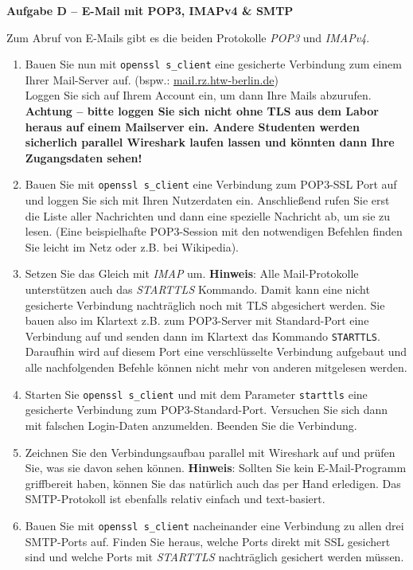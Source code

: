 \documentclass[paper=a4,fontsize=11pt]{scrartcl}%
\numberwithin{equation}{section}
\begin{document}
\begin{center}\Large{\textbf{Aufgabe D -- E-Mail mit POP3, IMAPv4 \& SMTP}}\end{center}\vskip0.25in
Zum Abruf von E-Mails gibt es die beiden Protokolle \emph{POP3} und \emph{IMAPv4}.
\begin{enumerate}
	\item Bauen Sie nun mit \texttt{openssl s\_client} eine gesicherte Verbindung zum einem Ihrer Mail-Server auf. (bspw.: \url{mail.rz.htw-berlin.de})\\
	Loggen Sie sich auf Ihrem Account ein, um dann Ihre Mails abzurufen.\\
	{\color{red}\textbf{Achtung -- bitte loggen Sie sich nicht ohne TLS aus dem Labor heraus auf einem Mailserver ein. Andere Studenten werden sicherlich parallel Wireshark  laufen lassen und könnten dann Ihre Zugangsdaten sehen!}}
	\item Bauen Sie mit \texttt{openssl s\_client} eine Verbindung zum POP3-SSL Port auf und loggen Sie sich mit Ihren Nutzerdaten ein. Anschließend rufen Sie erst die Liste aller Nachrichten und dann eine spezielle Nachricht ab, um sie zu lesen. (Eine beispielhafte POP3-Session mit den notwendigen Befehlen finden Sie leicht im Netz oder z.B. bei Wikipedia).
	\item Setzen Sie das Gleich mit \emph{IMAP} um.
	\textbf{Hinweis}: Alle Mail-Protokolle unterstützen auch das \emph{STARTTLS} Kommando. Damit kann eine nicht gesicherte Verbindung nachträglich noch mit TLS abgesichert werden. Sie bauen also im Klartext z.B. zum POP3-Server mit Standard-Port eine Verbindung auf und senden dann im Klartext das Kommando \texttt{STARTTLS}. Daraufhin wird auf diesem Port eine verschlüsselte Verbindung aufgebaut und alle nachfolgenden Befehle können nicht mehr von anderen mitgelesen werden.
	\item Starten Sie \texttt{openssl s\_client} und mit dem Parameter \texttt{starttls} eine gesicherte Verbindung zum POP3-Standard-Port. Versuchen Sie sich dann mit falschen Login-Daten anzumelden. Beenden Sie die Verbindung.
 	\item Zeichnen Sie den Verbindungsaufbau parallel mit Wireshark auf und prüfen Sie, was sie davon sehen können.
	\textbf{Hinweis}: Sollten Sie kein E-Mail-Programm griffbereit haben, können Sie das natürlich auch das per Hand erledigen. Das SMTP-Protokoll ist ebenfalls relativ einfach und text-basiert.
 	\item Bauen Sie mit \texttt{openssl s\_client} nacheinander eine Verbindung zu allen drei SMTP-Ports auf. Finden Sie heraus, welche Ports direkt mit SSL gesichert sind und welche Ports mit \emph{STARTTLS} nachträglich gesichert werden müssen.

\end{enumerate}
\end{document}
